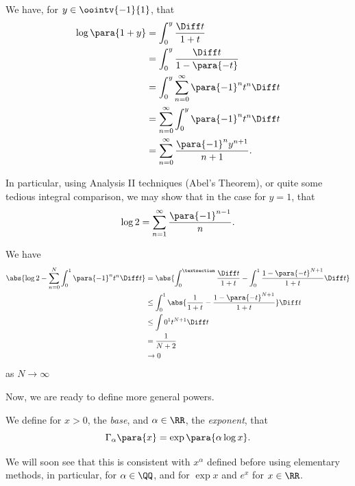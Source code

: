 \begin{remark}
    We have, for \(y \in \oointv{-1}{1}\), that
    \begin{align*}
        \log\para{1 + y} &= \int_0^y \frac{\Diff t}{1 + t} \\
        &= \int_0^y \frac{\Diff t}{1 - \para{-t}} \\
        &= \int_0^y \sum_{n = 0}^{\infty} \para{-1}^n t^n \Diff t \\
        &= \sum_{n = 0}^{\infty} \int_0^y \para{-1}^n t^n \Diff t \\
        &= \sum_{n = 0}^{\infty} \frac{\para{-1}^{n} y^{n + 1}}{n + 1}.
    \end{align*}

    In particular, using Analysis II techniques (Abel's Theorem), or quite some tedious integral comparison, we may show that in the case for \(y = 1\), that
    \[
        \log 2 = \sum_{n = 1}^{\infty} \frac{\para{-1}^{n - 1}}{n}.
    \]

    We have
    \begin{align*}
        \abs{\log 2 - \sum_{n = 0}^{N} \int_{0}^{1} \para{-1}^n t^n \Diff t} &= \abs{\int_{0}^{§} \frac{\Diff t}{1 + t} - \int_{0}^{1} \frac{1 - \para{-t}^{N + 1}}{1 + t} \Diff t} \\
        &\leq \int_{0}^{1} \abs{\frac{1}{1 + t} - \frac{1 - \para{-t}^{N + 1}}{1 + t}} \Diff t \\
        &\leq \int{0}^{1} t^{N + 1} \Diff t \\
        &= \frac{1}{N + 2} \\
        &\to 0
    \end{align*}
    as \(N \to \infty\)
\end{remark}

Now, we are ready to define more general powers.

\begin{definition}[Powers]
    \label{def:general-powers}%
    We define for \(x > 0\), the \emph{base}, and \(\alpha \in \RR\), the \emph{exponent}, that
    \[
        \Gamma_{\alpha} \para{x} = \exp \para{\alpha \log x}.
    \]
\end{definition}

\begin{remark}
    We will soon see that this is consistent with \(x^\alpha\) defined before using elementary methods, in particular, for \(\alpha \in \QQ\), and for \(\exp x\) and \(e^x\) for \(x \in \RR\).
\end{remark}

